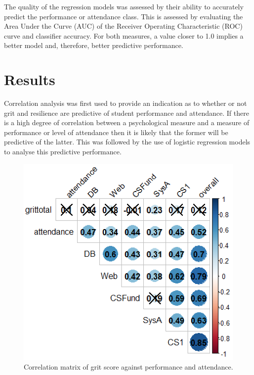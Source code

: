 \documentclass[sigconf]{acmart}
\begin{document}
The quality of the regression models was assessed by their ability to accurately predict the performance or attendance class. This is assessed by evaluating the Area Under the Curve (AUC) of the Receiver Operating Characteristic (ROC) curve and classifier accuracy. For both measures, a value closer to 1.0 implies a better model and, therefore, better predictive performance. 

\section {Results}
Correlation analysis was first used to provide an indication as to whether or not grit and resilience are predictive of student performance and attendance. If there is a high degree of correlation between a psychological measure and a measure of performance or level of attendance then it is likely that the former will be predictive of the latter. This was followed by the use of logistic regression models to analyse this predictive performance.


\begin{figure}[h]
\centering
\includegraphics[width=.9\linewidth]{images/cor_plot_grit.png}
\caption{Correlation matrix of grit score against performance and attendance.}
\label{fig:cor_grit} 
\end{figure}
\end{document}
